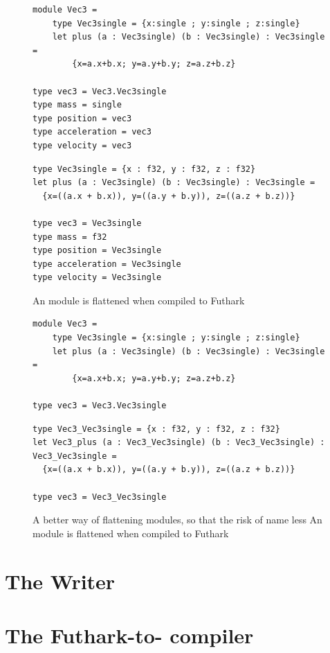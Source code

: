 \begin{figure}[H]
  \centering
\begin{verbatim}
module Vec3 =
    type Vec3single = {x:single ; y:single ; z:single}
    let plus (a : Vec3single) (b : Vec3single) : Vec3single =
        {x=a.x+b.x; y=a.y+b.y; z=a.z+b.z}
            
type vec3 = Vec3.Vec3single
type mass = single
type position = vec3
type acceleration = vec3
type velocity = vec3
\end{verbatim}

\begin{lstlisting}[language=Futhark]
type Vec3single = {x : f32, y : f32, z : f32}
let plus (a : Vec3single) (b : Vec3single) : Vec3single =
  {x=((a.x + b.x)), y=((a.y + b.y)), z=((a.z + b.z))}

type vec3 = Vec3single
type mass = f32
type position = Vec3single
type acceleration = Vec3single
type velocity = Vec3single
\end{lstlisting}
  \caption{An \fshark{} module is flattened when compiled to Futhark}
  \label{fig:moduleflattening}
\end{figure}

  
\begin{figure}[H]
  \centering
\begin{verbatim}
module Vec3 =
    type Vec3single = {x:single ; y:single ; z:single}
    let plus (a : Vec3single) (b : Vec3single) : Vec3single =
        {x=a.x+b.x; y=a.y+b.y; z=a.z+b.z}
            
type vec3 = Vec3.Vec3single
\end{verbatim}

\begin{lstlisting}[language=Futhark]
type Vec3_Vec3single = {x : f32, y : f32, z : f32}
let Vec3_plus (a : Vec3_Vec3single) (b : Vec3_Vec3single) : Vec3_Vec3single =
  {x=((a.x + b.x)), y=((a.y + b.y)), z=((a.z + b.z))}

type vec3 = Vec3_Vec3single
\end{lstlisting}
  \caption{A better way of flattening modules, so that the risk of name
    less An \fshark{} module is flattened when compiled to Futhark}
  \label{fig:moduleflattening'}
\end{figure}



\section{The \fshark{}Writer}
\section{The Futhark-to-\csharp{} compiler}
